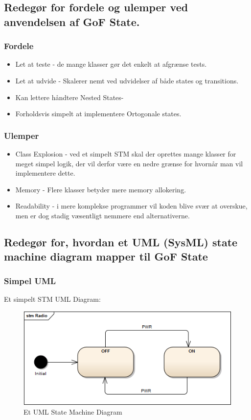 \subsection{Redegør for fordele og ulemper ved anvendelsen af GoF State.}

\subsubsection{Fordele}
\begin{itemize}
	\item Let at teste - de mange klasser gør det enkelt at afgrænse tests.
	\item Let at udvide - Skalerer nemt ved udvidelser af både states og transitions.
	\item Kan lettere håndtere Nested States-
	\item Forholdsvis simpelt at implementere Ortogonale states.
\end{itemize}

\subsubsection{Ulemper}
\begin{itemize}
	\item Class Explosion - ved et simpelt STM skal der oprettes mange klasser for meget simpel logik, der vil derfor være en nedre grænse for hvornår man vil implementere dette.
	\item Memory - Flere klasser betyder mere memory allokering.
	\item Readability - i mere komplekse programmer vil koden blive svær at overskue, men er dog stadig væsentligt nemmere end alternativerne.
\end{itemize}


\subsection{Redegør for, hvordan et UML (SysML) state machine diagram mapper til GoF State}
\subsubsection{Simpel UML}

Et simpelt STM UML Diagram:

\begin{figure}[H]
	\centering
	\includegraphics[width=0.7\linewidth]{figs/state/Radio_STM_Simpel}
	\caption{Et UML State Machine Diagram}
	\label{fig:UMLState}
\end{figure}

